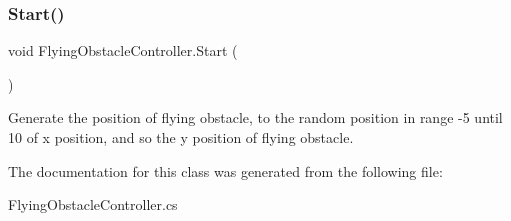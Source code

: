 \subsubsection{\texorpdfstring{Start()}{Start()}}
{\footnotesize\ttfamily void Flying\+Obstacle\+Controller.\+Start (\begin{DoxyParamCaption}{ }\end{DoxyParamCaption})\hspace{0.3cm}{\ttfamily [private]}}



Generate the position of flying obstacle, to the random position in range -\/5 until 10 of x position, and so the y position of flying obstacle. 



The documentation for this class was generated from the following file\+:\begin{DoxyCompactItemize}
\item 
Flying\+Obstacle\+Controller.\+cs\end{DoxyCompactItemize}

